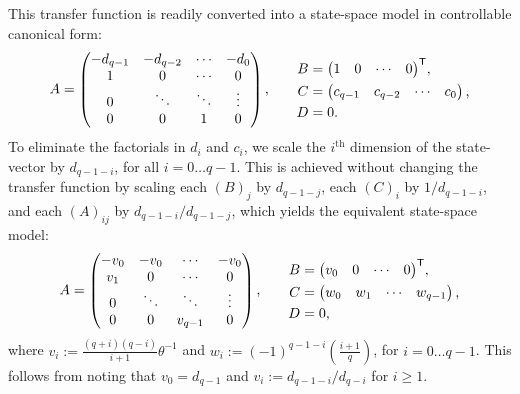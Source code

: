 This transfer function is readily converted into a state-space model in controllable canonical form:
\begin{equation*}
    \begin{alignedat}{2}
        A &= \begin{pmatrix} -d_{q-1} & -d_{q-2} & \cdots & -d_0 \\ 1 & 0 & \cdots & 0 \\ 0 & \ddots & \ddots & \vdots \\ 0 & 0 & 1 & 0\end{pmatrix} \text{,} & & \quad\quad \begin{alignedat}{1}
            B &= {\begin{pmatrix} 1 & 0 & \cdots & 0\end{pmatrix}}^\mathsf{T} \text{,} \\
            C &= \begin{pmatrix} c_{q-1} & c_{q-2} & \cdots & c_0\end{pmatrix} \text{,} \\
            D &= 0 \text{.}
        \end{alignedat}
    \end{alignedat}
\end{equation*}
To eliminate the factorials in $d_i$ and $c_i$, we scale the $i^{\text{th}}$ dimension of the state-vector by $d_{q-1-i}$, for all $i = 0 \ldots q - 1$.
This is achieved without changing the transfer function by scaling each $(B)_j$ by $d_{q-1-j}$, each $(C)_i$ by $1 / d_{q-1-i}$, and each $(A)_{ij}$ by $d_{q-1-i} / d_{q-1-j}$, which yields the equivalent state-space model:
\begin{equation}
    \begin{alignedat}{2}
        A &= \begin{pmatrix} -v_0 & -v_0 & \cdots & -v_0 \\ v_1 & 0 & \cdots & 0 \\ 0 & \ddots & \ddots & \vdots \\ 0 & 0 & v_{q-1} & 0\end{pmatrix} \text{,} & & \quad\quad \begin{alignedat}{1}
            B &= {\begin{pmatrix} v_0 & 0 & \cdots & 0\end{pmatrix}}^\mathsf{T} \text{,} \\
            C &= \begin{pmatrix} w_0 & w_1 & \cdots & w_{q-1} \end{pmatrix} \text{,} \\
            D &= 0 \text{,} \label{eq:ss-delay}
        \end{alignedat}
    \end{alignedat}
\end{equation}
where $v_i := \frac{(q+i)(q-i)}{i+1} \theta^{-1}$ and $w_i := (-1)^{q - 1 - i} \left( \frac{i+1}{q} \right)$, for $i = 0 \ldots q-1$.
This follows from noting that $v_0 = d_{q-1}$ and $v_i := d_{q-1-i} / d_{q-i}$ for $i \ge 1$.

